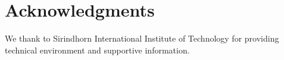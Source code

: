 \documentclass[10pt,letterpaper]{article}
\begin{document}
	
	\section*{Acknowledgments}
	We thank to Sirindhorn International Institute of Technology for providing technical environment and supportive information.
	
	
	
	\nolinenumbers
	
\end{document}
